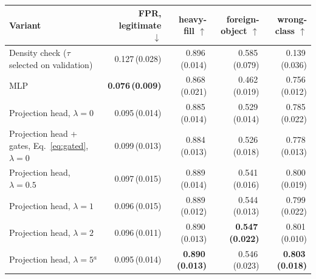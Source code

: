 \begin{table}[tb]
\centering
\caption{}
\label{tab:perfraud}
\begin{tabular}{lrrrr}
\toprule
Variant & FPR, legitimate $\downarrow$ & heavy-fill $\uparrow$ & foreign-object $\uparrow$ & wrong-class $\uparrow$ \\
\midrule
Density check ($\tau$ selected on validation) & 0.127\,(0.028) & 0.896\,(0.014) & 0.585\,(0.079) & 0.139\,(0.036) \\
MLP & \textbf{0.076\,(0.009)} & 0.868\,(0.021) & 0.462\,(0.019) & 0.756\,(0.012) \\
Projection head, $\lambda{=}0$ & 0.095\,(0.014) & 0.885\,(0.014) & 0.529\,(0.014) & 0.785\,(0.022) \\
Projection head + gates, Eq.~\eqref{eq:gated}, $\lambda{=}0$ & 0.099\,(0.013) & 0.884\,(0.013) & 0.526\,(0.018) & 0.778\,(0.013) \\
Projection head, $\lambda{=}0.5$ & 0.097\,(0.015) & 0.889\,(0.014) & 0.541\,(0.016) & 0.800\,(0.019) \\
Projection head, $\lambda{=}1$ & 0.096\,(0.015) & 0.889\,(0.012) & 0.544\,(0.013) & 0.799\,(0.022) \\
Projection head, $\lambda{=}2$ & 0.096\,(0.011) & 0.890\,(0.013) & \textbf{0.547\,(0.022)} & 0.801\,(0.010) \\
Projection head, $\lambda{=}5$$^{a}$ & 0.095\,(0.014) & \textbf{0.890\,(0.013)} & 0.546\,(0.023) & \textbf{0.803\,(0.018)} \\
\bottomrule
\end{tabular}
\end{table}
